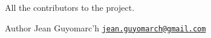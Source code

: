 All the contributors to the project.

\begin{DoxyAuthor}{Author}
Jean Guyomarc'h \href{mailto:jean.guyomarch@gmail.com}{\tt jean.\-guyomarch@gmail.\-com} 
\end{DoxyAuthor}
